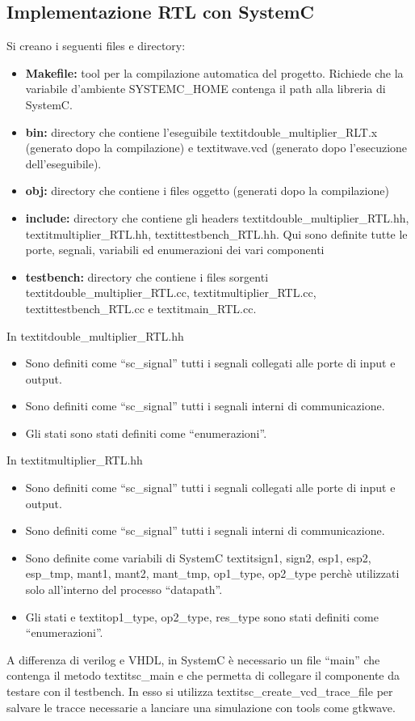 \documentclass[]{IEEEtran}
\begin{document}
\subsection{Implementazione RTL con SystemC}
Si creano i seguenti files e directory:
\begin{itemize}
    \item \textbf{Makefile:} tool per la compilazione automatica del progetto. Richiede che la variabile d'ambiente SYSTEMC\_HOME contenga il path alla libreria di SystemC.
    \item \textbf{bin:} directory che contiene l'eseguibile textit{double\_multiplier\_RLT.x} (generato dopo la compilazione) e textit{wave.vcd} (generato dopo l'esecuzione dell'eseguibile).
    \item \textbf{obj:} directory che contiene i files oggetto (generati dopo la compilazione)
    \item \textbf{include:} directory che contiene gli headers textit{double\_multiplier\_RTL.hh}, textit{multiplier\_RTL.hh}, textit{testbench\_RTL.hh}. Qui sono definite tutte le porte, segnali, variabili ed enumerazioni dei vari componenti
    \item \textbf{testbench:} directory che contiene i files sorgenti textit{double\_multiplier\_RTL.cc}, textit{multiplier\_RTL.cc}, textit{testbench\_RTL.cc} e textit{main\_RTL.cc}.
\end{itemize}
In textit{double\_multiplier\_RTL.hh}
\begin{itemize}
    \item Sono definiti come ``sc\_signal'' tutti i segnali collegati alle porte di input e output.
    \item Sono definiti come ``sc\_signal'' tutti i segnali interni di communicazione.
    \item Gli stati sono stati definiti come ``enumerazioni''.
\end{itemize}
In textit{multiplier\_RTL.hh}
\begin{itemize}
    \item Sono definiti come ``sc\_signal'' tutti i segnali collegati alle porte di input e output.
    \item Sono definiti come ``sc\_signal'' tutti i segnali interni di communicazione.
    \item Sono definite come variabili di SystemC textit{sign1, sign2, esp1, esp2, esp\_tmp, mant1, mant2, mant\_tmp, op1\_type, op2\_type} perchè utilizzati solo all'interno del processo ``datapath''.
    \item Gli stati e textit{op1\_type, op2\_type, res\_type} sono stati definiti come ``enumerazioni''.
\end{itemize}
A differenza di verilog e VHDL, in SystemC è necessario un file ``main'' che contenga il metodo textit{sc\_main} e che permetta di collegare il componente da testare con il testbench. In esso si utilizza textit{sc\_create\_vcd\_trace\_file} per salvare le tracce necessarie a lanciare una simulazione con tools come gtkwave.
\end{document}
